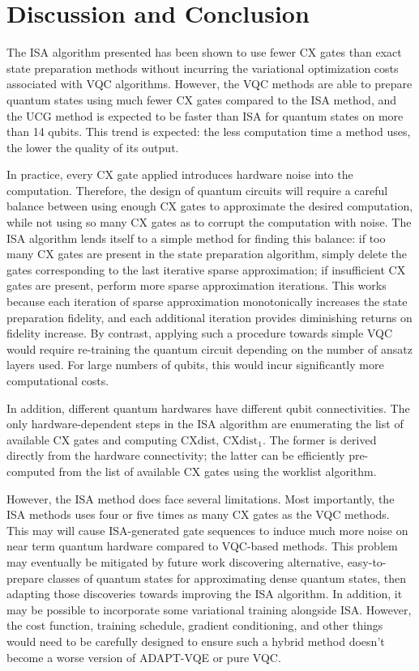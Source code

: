 \documentclass{article}
\begin{document}
\section{Discussion and Conclusion}
The ISA algorithm presented has been shown to use fewer CX gates than exact
state preparation methods without incurring the variational optimization costs
associated with VQC algorithms. However, the VQC methods are able to prepare
quantum states using much fewer CX gates compared to the ISA method, and the 
UCG method is expected to be faster than ISA for quantum states on more than 14
qubits. This trend is expected: the less computation time a method uses, the
lower the quality of its output.

In practice, every CX gate applied introduces hardware noise into the
computation. Therefore, the design of quantum circuits will require a careful
balance between using enough CX gates to approximate the desired computation,
while not using so many CX gates as to corrupt the computation with noise.
The ISA algorithm lends itself to a simple method for finding this balance:
if too many CX gates are present in the state preparation algorithm, simply
delete the gates corresponding to the last iterative sparse approximation; if
insufficient CX gates are present, perform more sparse approximation iterations.
This works because each iteration of sparse approximation monotonically
increases the state preparation fidelity, and each additional iteration provides
diminishing returns on fidelity increase. By contrast, applying such a procedure
towards simple VQC would require re-training the quantum circuit depending on
the number of ansatz layers used. For large numbers of qubits, this would incur
significantly more computational costs.

In addition, different quantum hardwares have different qubit connectivities.
The only hardware-dependent steps in the ISA algorithm are enumerating the list
of available CX gates and computing CXdist, $\text{CXdist}_1$. The former is
derived directly from the hardware connectivity; the latter can be efficiently
pre-computed from the list of available CX gates using the worklist algorithm.

However, the ISA method does face several limitations. Most importantly, the ISA
methods uses four or five times as many CX gates as the VQC methods. This may
will cause ISA-generated gate sequences to induce much more noise on near term
quantum hardware compared to VQC-based methods. This problem may eventually be
mitigated by future work discovering alternative, easy-to-prepare classes of 
quantum states for approximating dense quantum states, then adapting those
discoveries towards improving the ISA algorithm. In addition, it may be possible
to incorporate some variational training alongside ISA. However, the cost 
function, training schedule, gradient conditioning, and other things
would need to be carefully designed to ensure such a hybrid method doesn't 
become a worse version of ADAPT-VQE or pure VQC. 
\end{document}
